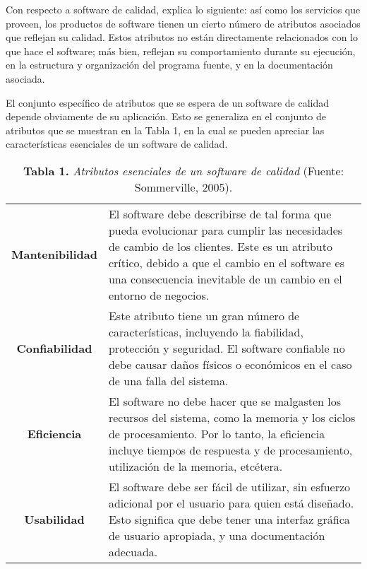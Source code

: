 	Con respecto a software de calidad, \cite{Sommerville} explica lo siguiente: as\'{i} como los servicios que proveen, los productos de software tienen un cierto n\'{u}mero de atributos asociados que reflejan su calidad. Estos atributos no est\'{a}n directamente relacionados con lo que hace el software; m\'{a}s bien, reflejan su comportamiento durante su ejecuci\'{o}n, en la estructura y organizaci\'{o}n del programa fuente, y en la documentaci\'{o}n asociada.

El conjunto espec\'{i}fico de atributos que se espera de un software de calidad depende obviamente de su aplicaci\'{o}n. Esto se generaliza en el conjunto de atributos que se muestran en la Tabla 1, en la cual se pueden apreciar las caracter\'{i}sticas esenciales de un software de calidad.

\FloatBarrier %
		\begin{table}[htb]
			\small
			\caption{\textbf{Tabla 1.} \textit{Atributos esenciales de un software de calidad} (Fuente: Sommerville, 2005).}
			\centering
			\setlength{\extrarowheight}{\altocelda}
			\begin{tabulary}{\anchotabla}{|c|J|}
				
				\hline
				 & \\ \hline
			\textbf{Mantenibilidad} & El software debe describirse de tal forma que pueda evolucionar  para cumplir las necesidades de cambio de los 					clientes. Este es un atributo cr\'{i}tico, debido a que el cambio en el software es una consecuencia inevitable de un cambio en el entorno de negocios.\\ \hline
			\textbf{Confiabilidad} & Este atributo tiene un gran n\'{u}mero de caracter\'{i}sticas, incluyendo la fiabilidad, protecci\'{o}n y seguridad. El software confiable no debe causar da\~{n}os f\'{i}sicos o econ\'{o}micos en el caso de una falla del sistema.\\ \hline
			\textbf{Eficiencia} & El software no debe hacer que se malgasten los recursos del sistema, como la memoria y los ciclos de procesamiento. Por lo tanto, la eficiencia incluye tiempos de respuesta y de procesamiento, utilizaci\'{o}n de la memoria, etc\'{e}tera.\\ \hline
			\textbf{Usabilidad} & El software debe ser f\'{a}cil de utilizar, sin esfuerzo adicional por el usuario para quien est\'{a} dise\~{n}ado. Esto significa que debe tener una interfaz gr\'{a}fica de usuario apropiada, y una documentaci\'{o}n adecuada.\\ \hline
			\end{tabulary}
		\end{table}
\FloatBarrier %


